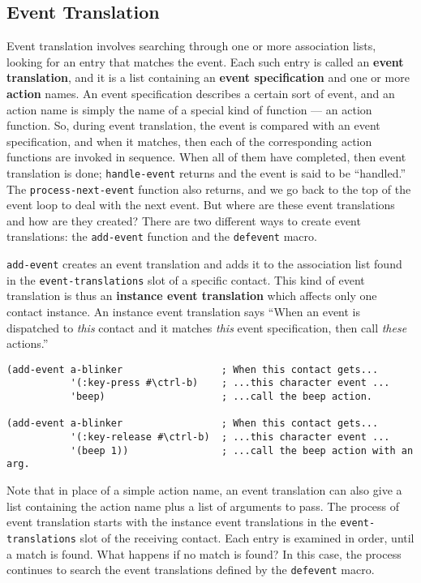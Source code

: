 \subsection{Event Translation}
Event translation involves searching through one or more association lists,
looking for an entry that matches the event. Each such entry is called an {\bf
event translation}, and it is a list containing an {\bf event
specification} and one or more {\bf
action} names. An event specification describes a certain sort of
event, and an action name is simply the name of a special kind of function
--- 
an action function. So, during event translation, the event is compared with an
event
specification, and when it matches, then each of the corresponding action functions are
invoked in sequence. When all of them have completed, then event
translation is done; {\tt handle-event} returns and the event is said to
be ``handled.'' The {\tt process-next-event} function also returns, and we
go back to the top of the event loop to deal with the next event.
But where are these event translations and how are they created? There are two
different ways to create event translations: the {\tt add-event} function and
the {\tt defevent} macro.

{\tt add-event}
creates an event translation and adds it to the association list
found in the {\tt event-translations} slot of a specific contact. This kind of
event translation is thus an {\bf instance event
translation} which affects only one contact instance. An instance event
translation says ``When an event is dispatched to {\em this} contact and it
matches {\em this} event specification, then call {\em these} actions.''

\begin{verbatim}
(add-event a-blinker                 ; When this contact gets...
           '(:key-press #\ctrl-b)    ; ...this character event ...
           'beep)                    ; ...call the beep action.

(add-event a-blinker                 ; When this contact gets...
           '(:key-release #\ctrl-b)  ; ...this character event ...
           '(beep 1))                ; ...call the beep action with an arg.
\end{verbatim}

Note that in place of a simple action name, an event translation can also give a
list containing the action name plus a list of arguments to pass.
The process of event translation starts with the instance event translations in
the {\tt event-translations} slot of the receiving contact. Each entry is
examined in order, until a match is found. What happens if no match is found? In
this case, the process continues to search the event translations defined by the
{\tt defevent} macro.

